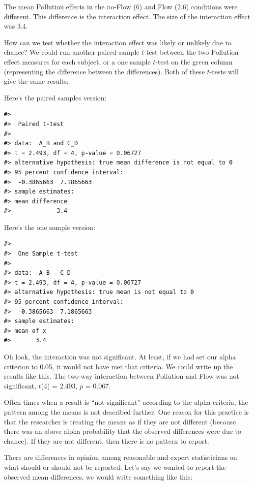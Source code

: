 \documentclass[
  letterpaper,
  DIV=11,
  numbers=noendperiod]{scrreprt}
\begin{document}
The mean Pollution effects in the no-Flow (6) and Flow (2.6) conditions
were different. This difference is the interaction effect. The size of
the interaction effect was 3.4.

How can we test whether the interaction effect was likely or unlikely
due to chance? We could run another paired-sample \(t\)-test between the
two Pollution effect measures for each subject, or a one sample
\(t\)-test on the green column (representing the difference between the
differences). Both of these \(t\)-tests will give the same results:

Here's the paired samples version:

\begin{verbatim}
#> 
#>  Paired t-test
#> 
#> data:  A_B and C_D
#> t = 2.493, df = 4, p-value = 0.06727
#> alternative hypothesis: true mean difference is not equal to 0
#> 95 percent confidence interval:
#>  -0.3865663  7.1865663
#> sample estimates:
#> mean difference 
#>             3.4
\end{verbatim}

Here's the one sample version:

\begin{verbatim}
#> 
#>  One Sample t-test
#> 
#> data:  A_B - C_D
#> t = 2.493, df = 4, p-value = 0.06727
#> alternative hypothesis: true mean is not equal to 0
#> 95 percent confidence interval:
#>  -0.3865663  7.1865663
#> sample estimates:
#> mean of x 
#>       3.4
\end{verbatim}

Oh look, the interaction was not significant. At least, if we had set
our alpha criterion to 0.05, it would not have met that criteria. We
could write up the results like this. The two-way interaction between
Pollution and Flow was not significant, \(t\)(4) = 2.493, \(p\) = 0.067.

Often times when a result is ``not significant'' according to the alpha
criteria, the pattern among the means is not described further. One
reason for this practice is that the researcher is treating the means as
if they are not different (because there was an above alpha probability
that the observed differences were due to chance). If they are not
different, then there is no pattern to report.

There are differences in opinion among reasonable and expert
statisticians on what should or should not be reported. Let's say we
wanted to report the observed mean differences, we would write something
like this:
\end{document}
